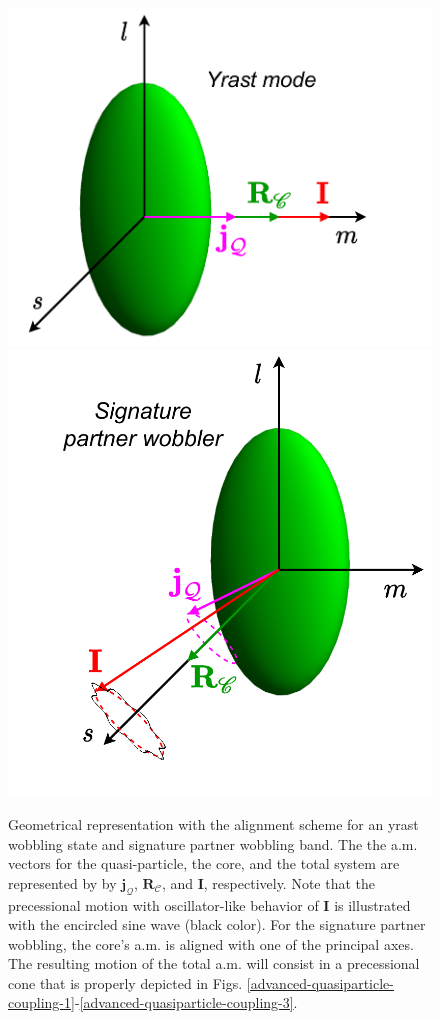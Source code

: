 \begin{figure}
    \centering
    \includegraphics[scale=0.55]{Chapters/Figures/yrast_wobbler-schematic.pdf}
    \includegraphics[scale=0.55]{Chapters/Figures/signaturePartner_wobbler-schematic.pdf}
    \caption{Geometrical representation with the alignment scheme for an yrast wobbling state and signature partner wobbling band. The the a.m. vectors for the quasi-particle, the core, and the total system are represented by by $\mathbf{j}_\mathcal{Q}$, $\mathbf{R}_\mathscr{C}$, and $\mathbf{I}$, respectively. Note that the precessional motion with oscillator-like behavior of $\mathbf{I}$ is illustrated with the encircled sine wave (black color). For the signature partner wobbling, the core's a.m. is aligned with one of the principal axes. The resulting motion of the total a.m. will consist in a precessional cone that is properly depicted in Figs. \ref{advanced-quasiparticle-coupling-1}-\ref{advanced-quasiparticle-coupling-3}.}
    \label{wobbling-geometry-YRAST-SPB}
\end{figure}


